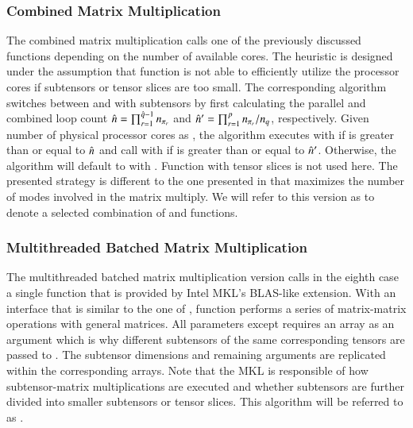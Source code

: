 \subsubsection{Combined Matrix Multiplication}
The combined matrix multiplication calls one of the previously discussed functions depending on the number of available cores.
The heuristic is designed under the assumption that function  is not able to efficiently utilize the processor cores if subtensors or tensor slices are too small.
The corresponding algorithm switches between  and  with subtensors by first calculating the parallel and combined loop count $\hat{n} = \prod_{r=1}^{\hat{q}-1} n_{\pi_r}$ and $\hat{n}' = \prod_{r=1}^{p} n_{\pi_r} / n_q$, respectively.
Given number of physical processor cores as , the algorithm executes  with  if  is greater than or equal to $\hat{n}$ and call  with  if  is greater than or equal to $\hat{n}'$.
Otherwise, the algorithm will default to  with .
Function  with tensor slices is not used here.
The presented strategy is different to the one presented in \cite{li:2015:input} that maximizes the number of modes involved in the matrix multiply.
We will refer to this version as  to denote a selected combination of  and  functions.

\subsubsection{Multithreaded Batched Matrix Multiplication}
The multithreaded batched matrix multiplication version calls in the eighth case a single  function that is provided by Intel MKL's BLAS-like extension.
With an interface that is similar to the one of , function  performs a series of matrix-matrix operations with general matrices.
All parameters except  requires an array as an argument which is why different subtensors of the same corresponding tensors are passed to .
The subtensor dimensions and remaining  arguments are replicated within the corresponding arrays.
Note that the MKL is responsible of how subtensor-matrix multiplications are executed and whether subtensors are further divided into smaller subtensors or tensor slices.
This algorithm will be referred to as .
